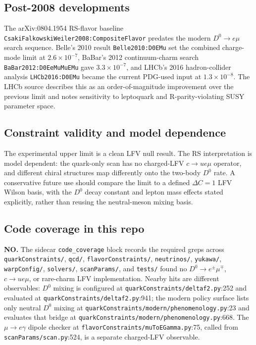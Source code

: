 \subsection*{Post-2008 developments}
The arXiv:0804.1954 RS-flavor baseline
\texttt{CsakiFalkowskiWeiler2008:CompositeFlavor} predates the modern
\(D^0\to e\mu\) search sequence.  Belle's 2010 result
\texttt{Belle2010:D0EMu} set the combined charge-mode limit at
\(2.6\times10^{-7}\), BaBar's 2012 continuum-charm search
\texttt{BaBar2012:D0EeMuMuEMu} gave \(3.3\times10^{-7}\), and LHCb's 2016
hadron-collider analysis \texttt{LHCb2016:D0EMu} became the current
PDG-used input at \(1.3\times10^{-8}\).  The LHCb source describes this as
an order-of-magnitude improvement over the previous limit and notes
sensitivity to leptoquark and R-parity-violating SUSY parameter space.

\subsection*{Constraint validity and model dependence}
The experimental upper limit is a clean LFV null result.  The RS interpretation
is model dependent: the quark-only scan has no charged-LFV \(c\to u e\mu\)
operator, and different chiral structures map differently onto the two-body
\(D^0\) rate.  A conservative future use should compare the limit to a defined
\(\Delta C=1\) LFV Wilson basis, with the \(D^0\) decay constant and lepton
mass effects stated explicitly, rather than reusing the neutral-meson mixing
basis.

\subsection*{Code coverage in this repo}
\textbf{NO.}  The sidecar \texttt{code\_coverage} block records the required
greps across \texttt{quarkConstraints/},
\texttt{qcd/}, \texttt{flavorConstraints/}, \texttt{neutrinos/},
\texttt{yukawa/}, \texttt{warpConfig/}, \texttt{solvers/},
\texttt{scanParams/}, and \texttt{tests/} found no
\(D^0\to e^\pm\mu^\mp\), \(c\to u e\mu\), or rare-charm LFV implementation.
Nearby hits are different observables: \(D^0\) mixing is configured at
\texttt{quarkConstraints/deltaf2.py}:252 and evaluated at
\texttt{quarkConstraints/deltaf2.py}:941; the modern policy surface lists
only neutral \(D^0\) mixing at
\texttt{quarkConstraints/modern/phenomenology.py}:23 and evaluates that
bridge at \texttt{quarkConstraints/modern/phenomenology.py}:668.  The
\(\mu\to e\gamma\) dipole checker at
\texttt{flavorConstraints/muToEGamma.py}:75, called from
\texttt{scanParams/scan.py}:524, is a separate charged-LFV observable.

